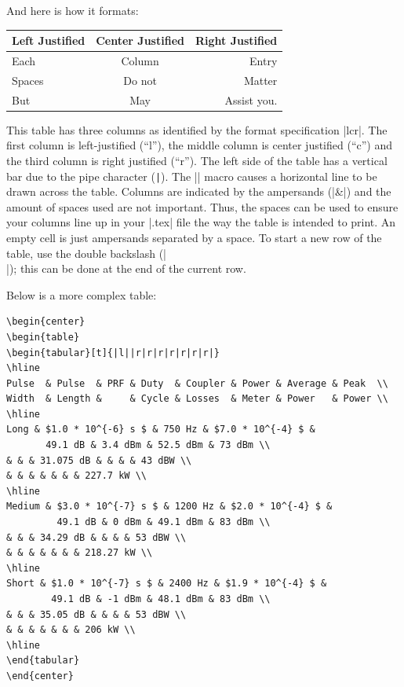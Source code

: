 And here is how it formats:

\begin{center}
\begin{tabular}{|lcr}
Left Justified & Center Justified & Right Justified \\
\hline
Each & Column & Entry \\
Spaces      & Do not    & Matter \\
But         & May       & Assist you. \\
\end{tabular}
\end{center}

This table has three columns as identified by the format specification
|lcr|. The first column is left-justified (``l''), the middle column
is center justified (``c'') and the third column is right justified
(``r''). The left side of the table has a vertical bar due to the pipe character (\verb+|+).  The |\hline| macro causes a horizontal line to be drawn across the table. 
Columns are indicated by the ampersands (|&|) and the amount of spaces used are not important.  Thus, the spaces can be used to ensure your columns line up in your |.tex| file the way the table is intended to print.
An empty cell is just ampersands separated by a space.
To start a new row of the table, use the double backslash (|\\|); this can be done at the end of the current row.

Below is a more complex table:


\begin{Verbatim}
\begin{center}
\begin{table}
\begin{tabular}[t]{|l||r|r|r|r|r|r|r|}
\hline
Pulse  & Pulse  & PRF & Duty  & Coupler & Power & Average & Peak  \\
Width  & Length &     & Cycle & Losses  & Meter & Power   & Power \\
\hline
Long & $1.0 * 10^{-6} s $ & 750 Hz & $7.0 * 10^{-4} $ & 
       49.1 dB & 3.4 dBm & 52.5 dBm & 73 dBm \\
& & & 31.075 dB & & & & 43 dBW \\
& & & & & & & 227.7 kW \\
\hline
Medium & $3.0 * 10^{-7} s $ & 1200 Hz & $2.0 * 10^{-4} $ & 
         49.1 dB & 0 dBm & 49.1 dBm & 83 dBm \\
& & & 34.29 dB & & & & 53 dBW \\
& & & & & & & 218.27 kW \\
\hline
Short & $1.0 * 10^{-7} s $ & 2400 Hz & $1.9 * 10^{-4} $ & 
        49.1 dB & -1 dBm & 48.1 dBm & 83 dBm \\
& & & 35.05 dB & & & & 53 dBW \\
& & & & & & & 206 kW \\
\hline
\end{tabular}
\end{center}
\end{Verbatim}

